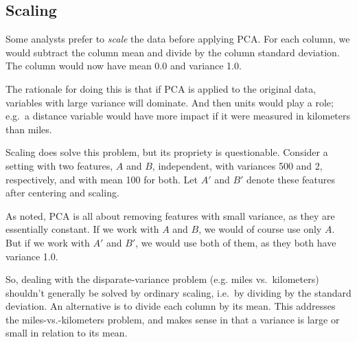 % 
% 
% 
% 

\subsection{Scaling}

Some analysts prefer to \textit{scale} the data before applying PCA.
For each column, we would subtract the column mean and divide by the
column standard deviation.  The column would now have mean 0.0 and
variance 1.0.

The rationale for doing this is that if PCA is applied to the original
data, variables with large variance will dominate.  And then units would
play a role; e.g.\ a distance variable would have more impact if it were
measured in kilometers than miles.

Scaling does solve this problem, but its propriety is questionable.
Consider a setting with two features, $A$ and $B$, independent, with
variances 500 and 2, respectively, and with mean 100 for both.  Let $A'$
and $B'$ denote these features after centering and scaling.

As noted, PCA is all about removing features with small variance, as
they are essentially constant. If we work with $A$ and $B$, we would of
course use only $A$. But if we work with $A'$ and $B'$, we would use
both of them, as they both have variance 1.0.

So, dealing with the disparate-variance problem (e.g. miles vs.\
kilometers) shouldn't generally be solved by ordinary scaling, i.e.\ by
dividing by the standard deviation.  An alternative is to divide each
column by its mean.  This addresses the miles-vs.-kilometers problem,
and makes sense in that a variance is large or small in relation to its
mean.

